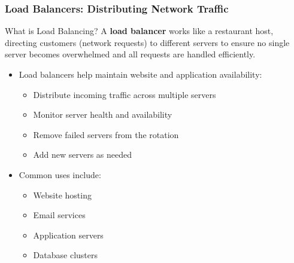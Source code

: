 \documentclass{beamer}
\begin{document}
\begin{frame}
    \frametitle{Load Balancers: Distributing Network Traffic}
    
    \begin{alertblock}{What is Load Balancing?}
        A \textbf{load balancer} works like a restaurant host, directing customers (network requests) to different servers to ensure no single server becomes overwhelmed and all requests are handled efficiently.
    \end{alertblock}
    
    \begin{itemize}
        \item Load balancers help maintain website and application availability:
        \begin{itemize}
            \item Distribute incoming traffic across multiple servers
            \item Monitor server health and availability
            \item Remove failed servers from the rotation
            \item Add new servers as needed
        \end{itemize}
        
        \item Common uses include:
        \begin{itemize}
            \item Website hosting
            \item Email services
            \item Application servers
            \item Database clusters
        \end{itemize}
    \end{itemize}
\end{frame}
\end{document}
